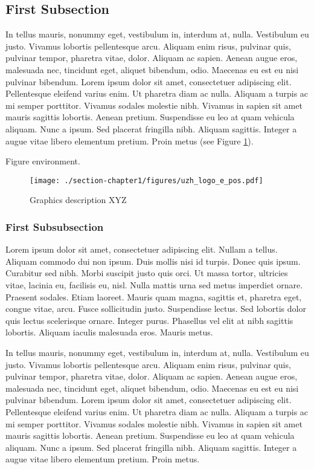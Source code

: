 \subsection{First Subsection}
\label{sst:subsection1} In tellus mauris, nonummy eget, vestibulum in,
interdum at, nulla. Vestibulum eu justo. Vivamus lobortis pellentesque arcu.
Aliquam enim risus, pulvinar quis, pulvinar tempor, pharetra vitae, dolor.
Aliquam ac sapien. Aenean augue eros, malesuada nec, tincidunt eget, aliquet
bibendum, odio. Maecenas eu est eu nisi pulvinar bibendum. Lorem ipsum dolor
sit amet, consectetuer adipiscing elit. Pellentesque eleifend varius enim. Ut
pharetra diam ac nulla. Aliquam a turpis ac mi semper porttitor. Vivamus
sodales molestie nibh. Vivamus in sapien sit amet mauris sagittis lobortis.
Aenean pretium. Suspendisse eu leo at quam vehicula aliquam. Nunc a ipsum. Sed
placerat fringilla nibh. Aliquam sagittis. Integer a augue vitae libero
elementum pretium. Proin metus (see Figure \ref{f:fig2}).

Figure environment.
\begin{figure}[!ht]
\centering
\texttt{[image: ./section-chapter1/figures/uzh\_logo\_e\_pos.pdf]}
\caption[Graphics description ABC]
{Graphics description XYZ}
\label{f:fig2}
\end{figure}

\subsubsection{First Subsubsection}
\label{ssst:subsubsection1} Lorem ipsum dolor sit amet, consectetuer
adipiscing elit. Nullam a tellus. Aliquam commodo dui non ipsum. Duis mollis
nisi id turpis. Donec quis ipsum. Curabitur sed nibh. Morbi suscipit justo quis
orci. Ut massa tortor, ultricies vitae, lacinia eu, facilisis eu, nisl. Nulla
mattis urna sed metus imperdiet ornare. Praesent sodales. Etiam laoreet. Mauris
quam magna, sagittis et, pharetra eget, congue vitae, arcu. Fusce sollicitudin
justo. Suspendisse lectus. Sed lobortis dolor quis lectus scelerisque ornare.
Integer purus. Phasellus vel elit at nibh sagittis lobortis. Aliquam iaculis
malesuada eros. Mauris metus.

In tellus mauris, nonummy eget, vestibulum in, interdum at, nulla. Vestibulum
eu justo. Vivamus lobortis pellentesque arcu. Aliquam enim risus, pulvinar
quis, pulvinar tempor, pharetra vitae, dolor. Aliquam ac sapien. Aenean augue
eros, malesuada nec, tincidunt eget, aliquet bibendum, odio. Maecenas eu est eu
nisi pulvinar bibendum. Lorem ipsum dolor sit amet, consectetuer adipiscing
elit. Pellentesque eleifend varius enim. Ut pharetra diam ac nulla. Aliquam a
turpis ac mi semper porttitor. Vivamus sodales molestie nibh. Vivamus in sapien
sit amet mauris sagittis lobortis. Aenean pretium. Suspendisse eu leo at quam
vehicula aliquam. Nunc a ipsum. Sed placerat fringilla nibh. Aliquam sagittis.
Integer a augue vitae libero elementum pretium. Proin metus.
